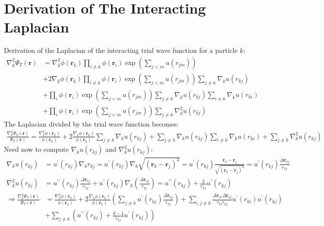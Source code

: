 \documentclass[12pt,a4paper,english]{article}
\begin{document}
\section{Derivation of The Interacting Laplacian}
\label{appendix:Laplacian}
Derivation of the Laplacian of the interacting trial wave function for a particle $k$:
\begin{align*}
\nabla_k^2\Psi_T(\textbf{r})&=\nabla_k^2\phi(\textbf{r}_k)\prod_{i\neq k}\phi(\textbf{r}_i)\exp\left(\sum_{j<m}u(r_{jm})\right)\\
&+ 2\nabla_k\phi(\textbf{r}_k)\prod_{i\neq k}\phi(\textbf{r}_i)\exp\left(\sum_{j<m}u(r_{jm})\right)\sum_{j\neq k}\nabla_ku(r_{kj})\\
&+ \prod_{i}\phi(\textbf{r}_i)\exp\left(\sum_{j<m}u(r_{jm})\right)\sum_{j\neq k}\nabla_ku(r_{kj})\sum_{i\neq k}\nabla_ku(r_{ki})\\
&+ \prod_{i}\phi(\textbf{r}_i)\exp\left(\sum_{j<m}u(r_{jm})\right)\sum_{j\neq k}\nabla_k^2u(r_{kj})
\end{align*}
The Laplacian divided by the trial wave function becomes:
\begin{align*}
\frac{\nabla_k^2\Psi_T(\textbf{r})}{\Psi_T(\textbf{r})}=\frac{\nabla_k^2\phi(\textbf{r}_k)}{\phi(\textbf{r}_k)}+2\frac{\nabla_k\phi(\textbf{r}_k)}{\phi(\textbf{r}_k)}\sum_{j\neq k}\nabla_ku(r_{kj})+\sum_{j\neq k}\nabla_ku(r_{kj})\sum_{i\neq k}\nabla_ku(r_{ki})+\sum_{j\neq k}\nabla_k^2u(r_{kj})
\end{align*}
Need now to compute $\nabla_k u(r_{kj})$ and $\nabla_k^2u(r_{kj})$:
\begin{align*}
\nabla_ku(r_{kj})&=u^{\prime}(r_{kj})\nabla_k r_{kj}=u^{\prime}(r_{kj})\nabla_k\sqrt{(\textbf{r}_k-\textbf{r}_j)^2}=u^{\prime}(r_{kj})\frac{\textbf{r}_k-\textbf{r}_j}{\sqrt{(\textbf{r}_k-\textbf{r}_j)^2}}=u^{\prime}(r_{kj})\frac{\Delta\textbf{r}_{kj}}{r_{kj}}\\
\nabla_k^2u(r_{kj})&=u^{\prime\prime}(r_{kj})\frac{\Delta\textbf{r}_{kj}}{r_{kj}}+u^{\prime}(r_{kj})\nabla_k\left(\frac{\Delta\textbf{r}_{kj}}{r_{kj}}\right)
=u^{\prime\prime}(r_{kj})+\frac{2}{r_{kj}}u^{\prime}(r_{kj})
\end{align*}
\begin{align*}
\Rightarrow \frac{\nabla_k^2\Psi_T(\textbf{r})}{\Psi_T(\textbf{r})}&= \frac{\nabla_k^2\phi(\textbf{r}_k)}{\phi(\textbf{r}_k)}+2\frac{\nabla_k\phi(\textbf{r}_k)}{\phi(\textbf{r}_k)}\left(\sum_{j\neq k}u^{\prime}(r_{kj})\frac{\Delta\textbf{r}_{kj}}{r_{kj}}\right)+\sum_{i,j\neq k}\frac{\Delta \textbf{r}_{ki}\Delta \textbf{r}_{kj}}{r_{ki}r_{kj}}u^{\prime}(r_{ki})u^{\prime}(r_{kj})\\
&+\sum_{j\neq k}\left(u^{\prime\prime}(r_{kj})+\frac{d-1}{r_{kj}}u^{\prime}(r_{kj})\right)
\end{align*}
\end{document}
